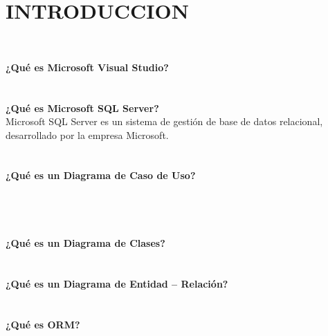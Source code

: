 \section{INTRODUCCION} 
\textbf{}\\
\begin{flushleft}
\textbf {¿Qué es Microsoft Visual Studio?}\\

\textbf{}\\
\textbf{}\\
\textbf {¿Qué es Microsoft SQL Server?}\\
Microsoft SQL Server es un sistema de gestión de base de datos relacional, desarrollado por la empresa Microsoft.\textbf{}\\


\textbf{}\\
\textbf{}\\
\textbf {¿Qué es un Diagrama de Caso de Uso?}\\

\textbf{}\\

\textbf{}\\


\textbf{}\\
\textbf{}\\
\textbf {¿Qué es un Diagrama de Clases?}\\

\textbf{}\\
\textbf{}\\
\textbf {¿Qué es un Diagrama de Entidad – Relación?}\\

\textbf{}\\
\textbf{}\\
\textbf {¿Qué es ORM?}
\textbf{}\\






 

\end{flushleft}